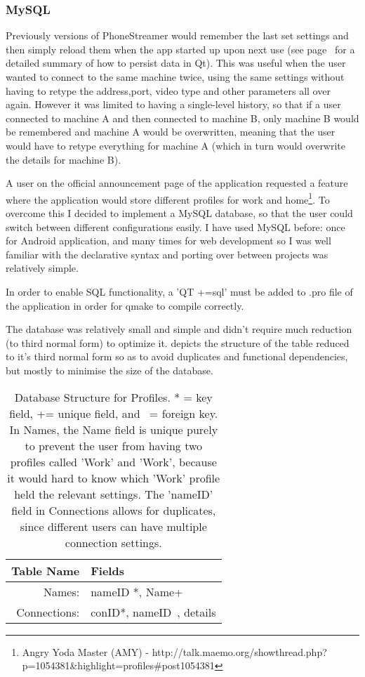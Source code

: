 \subsubsection{MySQL}
Previously versions of PhoneStreamer would remember the last set settings and then simply reload them when the app started up upon next use (see page~\pageref{QSettings} for a detailed summary of how to persist data in Qt). This was useful when the user wanted to connect to the same machine twice, using the same settings without having to retype the address,port, video type and other parameters all over again. However it was limited to having a single-level history, so that if a user connected to machine A and then connected to machine B, only machine B would be remembered and machine A would be overwritten, meaning that the user would have to retype everything for machine A (which in turn would overwrite the details for machine B).

A user on the official announcement page of the application requested a feature where the application would store different profiles for work and home\footnote{Angry Yoda Master (AMY) - http://talk.maemo.org/showthread.php?p=1054381\&highlight=profiles\#post1054381}.
To overcome this I decided to implement a MySQL database, so that the user could switch between different configurations easily. I have used MySQL before: once for Android application, and many times for web development so I was well familiar with the declarative syntax and porting over between projects was relatively simple.

In order to enable SQL functionality, a 'QT +=sql' must be added to .pro file of the application in order for qmake to compile correctly.

The database was relatively small and simple and didn't require much reduction (to third normal form) to optimize it.  depicts the structure of the table reduced to it's third normal form so as to avoid duplicates and functional dependencies, but mostly to minimise the size of the database.
\begin{table}[H]
\centering
\begin{tabular}{| r | l | }
\hline
Table Name	&Fields\\\hline
Names:		&nameID *, Name+\\
Connections: 	&conID*, nameID~, details\\\hline
\end{tabular}
\caption{Database Structure for Profiles. * = key field, += unique field, and ~= foreign key. In Names, the Name field is unique purely to prevent the user from having two profiles called 'Work' and 'Work', because it would hard to know which 'Work' profile held the relevant settings. The 'nameID' field in Connections allows for duplicates, since different users can have multiple connection settings.}
\label{tab:profiledb}
\end{table}

